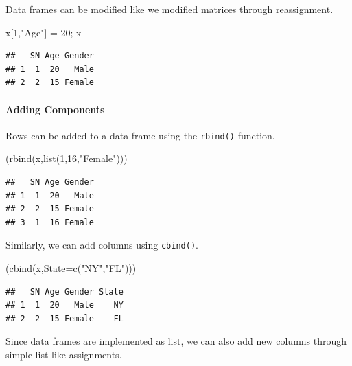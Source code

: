 \documentclass[
]{book}
\newenvironment{Shaded}{\begin{snugshade}}{\end{snugshade}}
\newcommand{\AttributeTok}[1]{\textcolor[rgb]{0.77,0.63,0.00}{#1}}
\newcommand{\DecValTok}[1]{\textcolor[rgb]{0.00,0.00,0.81}{#1}}
\newcommand{\FunctionTok}[1]{\textcolor[rgb]{0.00,0.00,0.00}{#1}}
\newcommand{\NormalTok}[1]{#1}
\newcommand{\OtherTok}[1]{\textcolor[rgb]{0.56,0.35,0.01}{#1}}
\newcommand{\StringTok}[1]{\textcolor[rgb]{0.31,0.60,0.02}{#1}}
\begin{document}
Data frames can be modified like we modified matrices through reassignment.

\begin{Shaded}
\begin{Highlighting}[]
\NormalTok{x[}\DecValTok{1}\NormalTok{,}\StringTok{"Age"}\NormalTok{] }\OtherTok{=} \DecValTok{20}\NormalTok{; x}
\end{Highlighting}
\end{Shaded}

\begin{verbatim}
##   SN Age Gender
## 1  1  20   Male
## 2  2  15 Female
\end{verbatim}

\hypertarget{adding-components}{%
\paragraph{Adding Components}\label{adding-components}}

Rows can be added to a data frame using the \texttt{rbind()} function.

\begin{Shaded}
\begin{Highlighting}[]
\NormalTok{(}\FunctionTok{rbind}\NormalTok{(x,}\FunctionTok{list}\NormalTok{(}\DecValTok{1}\NormalTok{,}\DecValTok{16}\NormalTok{,}\StringTok{"Female"}\NormalTok{)))}
\end{Highlighting}
\end{Shaded}

\begin{verbatim}
##   SN Age Gender
## 1  1  20   Male
## 2  2  15 Female
## 3  1  16 Female
\end{verbatim}

Similarly, we can add columns using \texttt{cbind()}.

\begin{Shaded}
\begin{Highlighting}[]
\NormalTok{(}\FunctionTok{cbind}\NormalTok{(x,}\AttributeTok{State=}\FunctionTok{c}\NormalTok{(}\StringTok{"NY"}\NormalTok{,}\StringTok{"FL"}\NormalTok{)))}
\end{Highlighting}
\end{Shaded}

\begin{verbatim}
##   SN Age Gender State
## 1  1  20   Male    NY
## 2  2  15 Female    FL
\end{verbatim}

Since data frames are implemented as list, we can also add new columns through simple list-like assignments.
\end{document}
